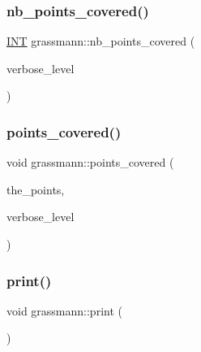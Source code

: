 \subsubsection{\texorpdfstring{nb\+\_\+points\+\_\+covered()}{nb\_points\_covered()}}
{\footnotesize\ttfamily \mbox{\hyperlink{galois_8h_a09fddde158a3a20bd2dcadb609de11dc}{I\+NT}} grassmann\+::nb\+\_\+points\+\_\+covered (\begin{DoxyParamCaption}\item[{\mbox{\hyperlink{galois_8h_a09fddde158a3a20bd2dcadb609de11dc}{I\+NT}}}]{verbose\+\_\+level }\end{DoxyParamCaption})}

\mbox{\label{classgrassmann_a8c7859b717d4a34241d98a213e774ab1}} 
\subsubsection{\texorpdfstring{points\+\_\+covered()}{points\_covered()}}
{\footnotesize\ttfamily void grassmann\+::points\+\_\+covered (\begin{DoxyParamCaption}\item[{\mbox{\hyperlink{galois_8h_a09fddde158a3a20bd2dcadb609de11dc}{I\+NT}} $\ast$}]{the\+\_\+points,  }\item[{\mbox{\hyperlink{galois_8h_a09fddde158a3a20bd2dcadb609de11dc}{I\+NT}}}]{verbose\+\_\+level }\end{DoxyParamCaption})}

\mbox{\label{classgrassmann_a7597fa53f5ac361952fbe88fad1dde05}} 
\subsubsection{\texorpdfstring{print()}{print()}}
{\footnotesize\ttfamily void grassmann\+::print (\begin{DoxyParamCaption}{ }\end{DoxyParamCaption})}

\mbox{\label{classgrassmann_aa15444bcee49f332c44023d44b04d87b}} 
